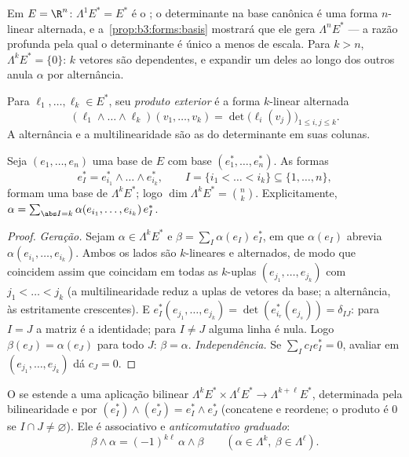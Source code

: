 \begin{example}
Em $E = \R^n$: $\Lambda^1E^* = E^*$ é o ; o determinante na base canônica é uma
forma $n$-linear alternada, e a~\cref{prop:b3:forms:basis} mostrará que ele gera
$\Lambda^nE^*$ --- a razão profunda pela qual o determinante é único a menos de
escala. Para $k > n$, $\Lambda^kE^* = \{0\}$: $k$ vetores são dependentes, e expandir
um deles ao longo dos outros anula $\alpha$ por alternância.
\end{example}

\begin{definition}\label{def:b3:forms:wedge}
Para $\ell_1, \dots, \ell_k \in E^*$, seu \emph{produto exterior} é a forma
$k$-linear alternada
\[
(\ell_1 \wedge \dots \wedge \ell_k)(v_1, \dots, v_k)
= \det\bigl(\ell_i(v_j)\bigr)_{1 \leq i, j \leq k} .
\]
A alternância e a multilinearidade são as do determinante em suas
colunas.
\end{definition}

\begin{proposition}\label{prop:b3:forms:basis}
Seja $(e_1, \dots, e_n)$ uma base de $E$ com base  $(e_1^*, \dots, e_n^*)$. As formas
\[
e_I^* = e_{i_1}^* \wedge \dots \wedge e_{i_k}^*,
\qquad I = \{i_1 < \dots < i_k\} \subseteq \{1, \dots, n\},
\]
formam uma base de $\Lambda^kE^*$; logo $\dim\Lambda^kE^* =
\binom nk$. Explicitamente, $\alpha =
\sum_{\abs I = k}\alpha(e_{i_1}, \dots, e_{i_k})\,e_I^*$.
\end{proposition}

\begin{proof}
\emph{Geração.} Sejam $\alpha \in \Lambda^kE^*$ e $\beta =
\sum_I\alpha(e_I)\,e_I^*$, em que $\alpha(e_I)$ abrevia $\alpha(e_{i_1}, \dots, e_{i_k})$. Ambos os
lados são $k$-lineares e alternados, de modo que coincidem assim que
coincidam em todas as $k$-uplas $(e_{j_1}, \dots, e_{j_k})$ com $j_1 < \dots <
j_k$ (a multilinearidade
reduz a uplas de vetores da base; a alternância, às estritamente
crescentes). E $e_I^*(e_{j_1},
\dots, e_{j_k}) = \det(e_{i_r}^*(e_{j_s})) = \delta_{IJ}$: para $I = J$ a matriz é a identidade; para $I \neq J$
alguma linha é nula. Logo $\beta(e_J) = \alpha(e_J)$ para todo $J$: $\beta = \alpha$.
\emph{Independência.} Se $\sum_I c_Ie_I^* = 0$, avaliar em $(e_{j_1}, \dots, e_{j_k})$ dá $c_J = 0$.
\end{proof}

\begin{definition}\label{def:b3:forms:wedgegeneral}
O  se estende a uma aplicação bilinear $\Lambda^kE^* \times \Lambda^\ell E^* \to
\Lambda^{k+\ell}E^*$, determinada
pela bilinearidade e por $(e_I^*) \wedge (e_J^*) = e_I^* \wedge e_J^*$ (concatene e reordene; o produto é $0$
se $I \cap J \neq
\varnothing$). Ele é associativo e \emph{anticomutativo graduado}:
\[
\beta \wedge \alpha = (-1)^{k\ell}\,\alpha \wedge \beta
\qquad (\alpha \in \Lambda^k, \ \beta \in \Lambda^\ell).
\]
\end{definition}

